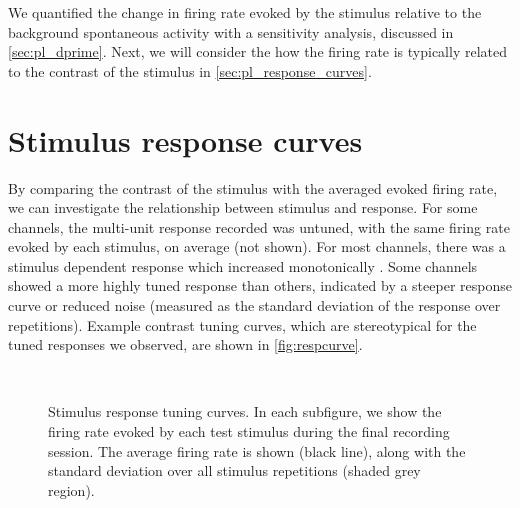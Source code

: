 We quantified the change in firing rate evoked by the stimulus relative to the background spontaneous activity with a sensitivity analysis, discussed in \autoref{sec:pl_dprime}.
Next, we will consider the how the firing rate is typically related to the contrast of the stimulus in \autoref{sec:pl_response_curves}.


\section{Stimulus response curves}
\label{sec:pl_response_curves}

By comparing the contrast of the stimulus with the averaged evoked firing rate, we can investigate the relationship between stimulus and response.
For some channels, the multi-unit response recorded was untuned, with the same firing rate evoked by each stimulus, on average (not shown).
For most channels, there was a stimulus dependent response which increased monotonically .
Some channels showed a more highly tuned response than others, indicated by a steeper response curve or reduced noise (measured as the standard deviation of the response over repetitions).
Example contrast tuning curves, which are stereotypical for the tuned responses we observed, are shown in \autoref{fig:respcurve}.


\begin{figure}[htbp]
    \centering
    \hspace*{\fill}
    \hspace{.4cm}
    \hspace*{\fill}
    \\
    \hspace*{\fill}
    \hspace{.4cm}
    \hspace*{\fill}
    \caption{Stimulus response tuning curves.
    In each subfigure, we show the firing rate evoked by each test stimulus during the final recording session.
    The average firing rate is shown (black line), along with the standard deviation over all stimulus repetitions (shaded grey region).
}
    \label{fig:respcurve}
\end{figure}
